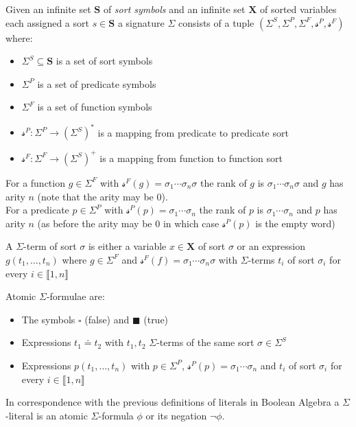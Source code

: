 \begin{definition}[Signature]
Given an infinite set $\mathbf{S}$ of \textit{sort symbols} and an infinite set $\mathbf{X}$ of sorted variables each assigned a sort $s\in\mathbf{S}$ a signature $\Sigma$ consists of a tuple $\left(\Sigma^S, \Sigma^P, \Sigma^F, \mathcal{s}^P, \mathcal{s}^F \right)$ where:
\begin{itemize}
    \item $\Sigma^S \subseteq \mathbf{S}$ is a set of sort symbols
    \item $\Sigma^P$ is a set of predicate symbols
    \item $\Sigma^F$ is a set of function symbols
    \item $\mathcal{s}^P\colon \Sigma^P \to \left(\Sigma^S\right)^\ast$ is a mapping from predicate to predicate sort
    \item $\mathcal{s}^F\colon \Sigma^F \to \left(\Sigma^S\right)^+$ is a mapping from function to function sort
\end{itemize}
\end{definition}

\begin{definition}
For a function $g\in\Sigma^F$ with $\mathcal{s}^F(g)=\sigma_1\dotsi\sigma_n\sigma$ the rank of $g$ is $\sigma_1\dotsi\sigma_n\sigma$ and $g$ has arity $n$ (note that the arity may be $0$).\\
For a predicate $p\in\Sigma^P$ with $\mathcal{s}^P(p)=\sigma_1\dotsi\sigma_n$ the rank of $p$ is $\sigma_1\dotsi\sigma_n$ and $p$ has arity $n$ (as before the arity may be $0$ in which case $\mathcal{s}^P(p)$ is the empty word)
\end{definition}

\begin{definition}
A $\Sigma$-term of sort $\sigma$ is either a variable $x\in\mathbf{X}$ of sort $\sigma$ or an expression $g\left(t_1,\dots,t_n\right)$ where $g\in\Sigma^F$ and $\mathcal{s}^F(f)=\sigma_1\dotsi\sigma_n\sigma$ with $\Sigma$-terms $t_i$ of sort $\sigma_i$ for every $i\in\llbracket1,n\rrbracket$
\end{definition}

\begin{definition}
Atomic $\Sigma$-formulae are:
\begin{itemize}
    \item The symbols $\square$ (false) and $\blacksquare$ (true)
    \item Expressions $t_1 \doteq t_2$ with $t_1, t_2$ $\Sigma$-terms of the same sort $\sigma\in\Sigma^S$
    \item Expressions $p\left(t_1,\dots,t_n\right)$ with $p\in\Sigma^P$, $\mathcal{s}^P(p)=\sigma_1\dotsi\sigma_n$ and $t_i$ of sort $\sigma_i$ for every $i\in\llbracket1,n\rrbracket$
\end{itemize}
In correspondence with the previous definitions of literals in Boolean Algebra a $\Sigma$-literal is an atomic $\Sigma$-formula $\phi$ or its negation $\neg\phi$.
\end{definition}

